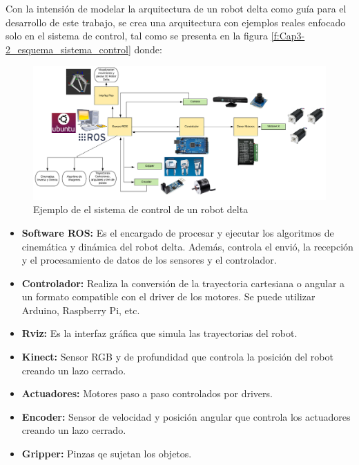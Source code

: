        \newpage

    Con la intensión de modelar la arquitectura de un robot delta como guía para el desarrollo de este trabajo, se crea una arquitectura con ejemplos reales enfocado solo en el sistema de control, tal como se presenta en la figura \eqref{f:Cap3-2_esquema_sistema_control} donde:

    \begin{figure}[h]
        \centering
        \includegraphics[width=1\linewidth]{Main/Chapter3/Images3/3-2/sistema-de-control.png}
        \caption{Ejemplo de el sistema de control de un robot delta}
        \label{f:Cap3-2_esquema_sistema_control}
    \end{figure}
    
    \begin{itemize}
        \item \textbf{Software ROS:} Es el encargado de procesar y ejecutar los algoritmos de cinemática y dinámica del robot delta. Además, controla el envió, la recepción y el procesamiento de datos de los sensores y el controlador.
        \item \textbf{Controlador:} Realiza la conversión de la trayectoria cartesiana o angular a un formato compatible con el driver de los motores. Se puede utilizar Arduino, Raspberry Pi, etc.
        \item \textbf{Rviz:} Es la interfaz gráfica que simula las trayectorias del robot.
        \item \textbf{Kinect:} Sensor RGB y de profundidad que controla la posición del robot creando un lazo cerrado.
        \item \textbf{Actuadores:} Motores paso a paso controlados por drivers.
        \item \textbf{Encoder:} Sensor de velocidad y posición angular que controla los actuadores creando un lazo cerrado.
        \item \textbf{Gripper:} Pinzas qe sujetan los objetos.
    \end{itemize}
    
